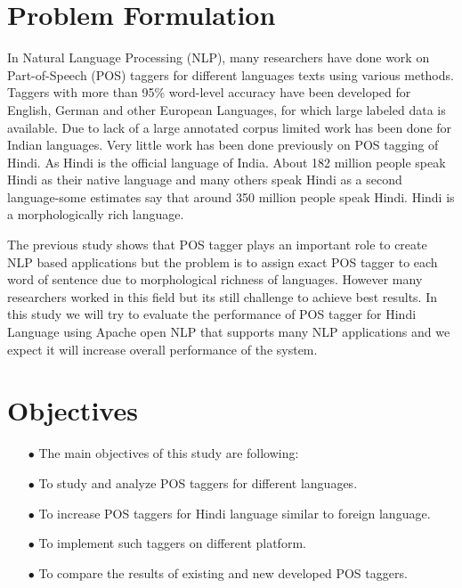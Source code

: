 \documentclass[12pt,a4paper,oneside]{memoir}
\begin{document}
\section{Problem Formulation}
In Natural Language Processing (NLP), many researchers have done work on Part-of-Speech (POS) taggers for different languages texts using various methods. Taggers with more than 95\% word-level accuracy have been developed for English, German and other European Languages, for which large labeled data is available.  Due to lack of a large annotated corpus limited work has been done for Indian languages. Very little work has been done previously on POS tagging of Hindi. As Hindi is the official language of India. About 182 million people speak Hindi as their native language and many others speak Hindi as a second language-some estimates say that around 350 million people speak Hindi. Hindi is a morphologically rich language. 

The previous study shows that POS tagger plays an important role to create NLP based applications but the problem is to assign exact POS tagger to each word of sentence due to morphological richness of languages. However many researchers worked in this field but its still challenge to achieve best results. In this study we will try to evaluate the performance of POS tagger for Hindi Language using Apache open NLP that supports many NLP applications and we expect it will increase overall performance of the system.\\
  
\section{Objectives}

\begin{itemize}
  \item[$\bullet$]The main objectives of this study are following:
  \item[$\bullet$]To study and analyze POS taggers for different languages.
  \item[$\bullet$]To increase POS taggers for Hindi language similar to foreign language.
  \item[$\bullet$]To implement such taggers on different platform.
  \item[$\bullet$]To compare the results of existing and new developed POS taggers.
\end{itemize}
\end{document}
